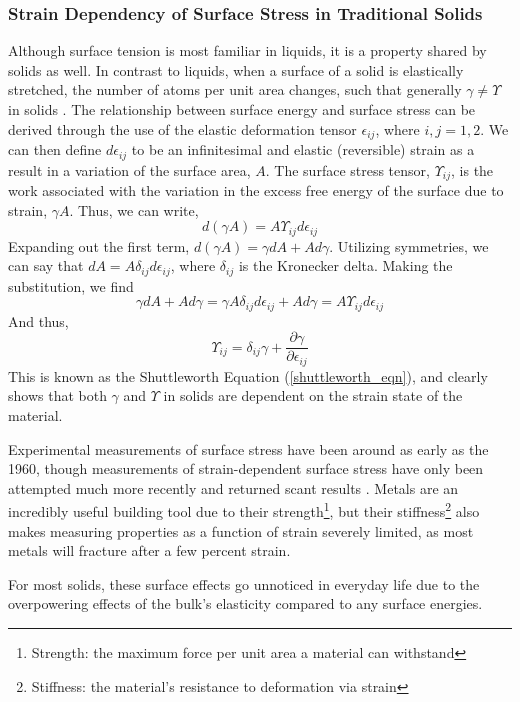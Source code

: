 \subsubsection{Strain Dependency of Surface Stress in Traditional Solids}
Although surface tension is most familiar in liquids, it is a property shared by solids as well.  In contrast to liquids, when a surface of a solid is elastically stretched, the number of atoms per unit area changes, such that generally $ \gamma \neq \Upsilon$ in solids \cite{cammarata1994surface}. The relationship between surface energy and surface stress can be derived through the use of the elastic deformation tensor $\epsilon_{ij}$, where $i,j=1,2$. We can then define $d\epsilon_{ij}$ to be an infinitesimal and elastic (reversible) strain as a result in a variation of the surface area, $A$. The surface stress tensor, $\Upsilon_{ij}$, is the work associated with the variation in the excess free energy of the surface due to strain, $\gamma A$. Thus, we can write, \[d(\gamma A) = A \Upsilon_{ij} d\epsilon_{ij}\] Expanding out the first term, $d(\gamma A) = \gamma dA + A d\gamma$. Utilizing symmetries, we can say that $dA = A \delta_{ij} d\epsilon_{ij}$, where $\delta_{ij}$ is the Kronecker delta. Making the substitution, we find \[\gamma dA + A d\gamma = \gamma A \delta_{ij} d\epsilon_{ij} + A d\gamma = A \Upsilon_{ij} d\epsilon_{ij}\] And thus,
\begin{equation}
\label{shuttleworth_eqn}
\Upsilon_{ij} = \delta_{ij}\gamma + \frac{\partial \gamma}{\partial \epsilon_{ij}} 
\end{equation}
This is known as the Shuttleworth Equation (\ref{shuttleworth_eqn}), and clearly shows that both $\gamma$ and $\Upsilon$ in solids are dependent on the strain state of the material.

Experimental measurements of surface stress have been around as early as the 1960, though measurements of strain-dependent surface stress have only been attempted much more recently and returned scant results \cite{mays1968surface,wasserman1970determination,hanneman1962elastic,martinez1990direct,schell1990mechanical}. Metals are an incredibly useful building tool due to their strength\footnote{Strength: the maximum force per unit area a material can withstand}, but their stiffness\footnote{Stiffness: the material's resistance to deformation via strain} also makes measuring properties as a function of strain severely limited, as most metals will fracture after a few percent strain.

For most solids, these surface effects go unnoticed in everyday life due to the overpowering effects of the bulk's elasticity compared to any surface energies. 



